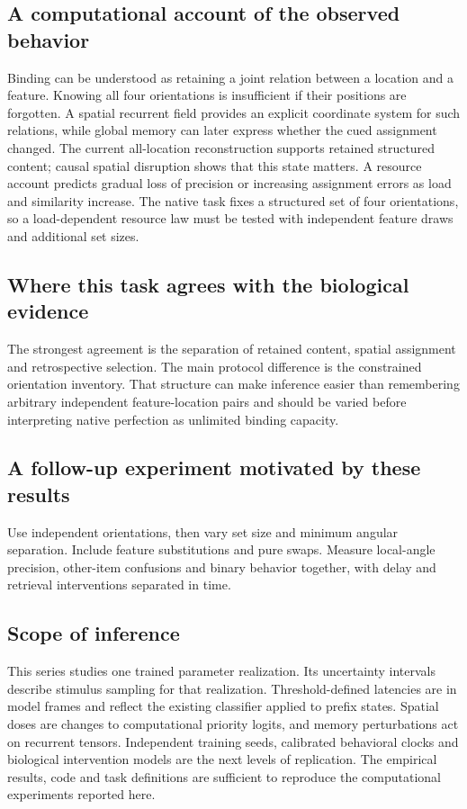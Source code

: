 \documentclass[11pt]{article}
\begin{document}
\subsection{A computational account of the observed behavior}
Binding can be understood as retaining a joint relation between a location and a feature. Knowing all four orientations is insufficient if their positions are forgotten. A spatial recurrent field provides an explicit coordinate system for such relations, while global memory can later express whether the cued assignment changed. The current all-location reconstruction supports retained structured content; causal spatial disruption shows that this state matters. A resource account predicts gradual loss of precision or increasing assignment errors as load and similarity increase. The native task fixes a structured set of four orientations, so a load-dependent resource law must be tested with independent feature draws and additional set sizes.

\subsection{Where this task agrees with the biological evidence}
The strongest agreement is the separation of retained content, spatial assignment and retrospective selection. The main protocol difference is the constrained orientation inventory. That structure can make inference easier than remembering arbitrary independent feature-location pairs and should be varied before interpreting native perfection as unlimited binding capacity.

\subsection{A follow-up experiment motivated by these results}
Use independent orientations, then vary set size and minimum angular separation. Include feature substitutions and pure swaps. Measure local-angle precision, other-item confusions and binary behavior together, with delay and retrieval interventions separated in time.
\subsection{Scope of inference}
This series studies one trained parameter realization. Its uncertainty intervals describe stimulus sampling for that realization. Threshold-defined latencies are in model frames and reflect the existing classifier applied to prefix states. Spatial doses are changes to computational priority logits, and memory perturbations act on recurrent tensors. Independent training seeds, calibrated behavioral clocks and biological intervention models are the next levels of replication. The empirical results, code and task definitions are sufficient to reproduce the computational experiments reported here.
\end{document}
